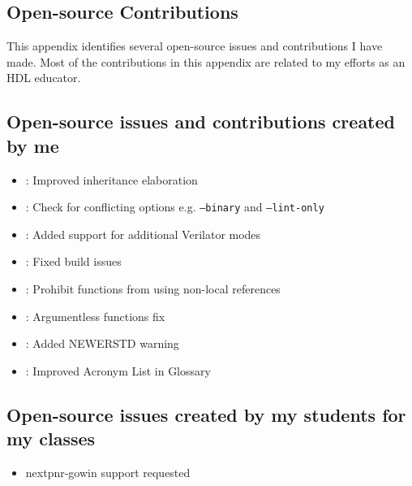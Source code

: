 
\begin{appendices}



\chapter{Open-source Contributions}
\label{appx:contributions}

This appendix identifies several open-source issues and contributions I have made. Most of the contributions in this appendix are related to my efforts as an HDL educator.

\section{Open-source issues and contributions created by me}

\begin{itemize}
    \item [\pullrequesticon] : Improved inheritance elaboration
    \item [\mergedicon] : Check for conflicting options e.g. \texttt{--binary} and \texttt{--lint-only}
    \item [\pullrequesticon] : Added support for additional Verilator modes
    \item [\pullrequesticon] : Fixed build issues
    \item [\mergedicon] : Prohibit functions from using non-local references
    \item [\mergedicon] : Argumentless functions fix
    \item [\mergedicon] : Added NEWERSTD warning
    \item [\mergedicon] : Improved Acronym List in Glossary
\end{itemize}

\section{Open-source issues created by my students for my classes}

\begin{itemize}
    \item [\issueclosedicon]  nextpnr-gowin support requested
\end{itemize}




\end{appendices}
